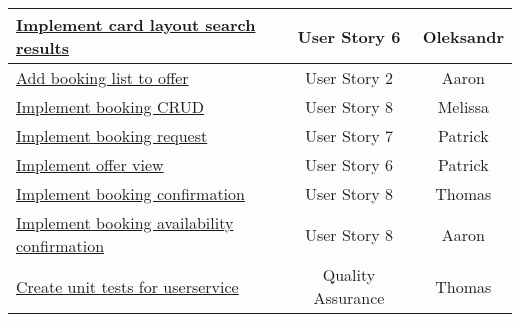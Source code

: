 \begin{table}[h]
\begin{tabular}{|l|c|c|}
        \hline
        \href{https://gitlab.rz.uni-bamberg.de/swt/teaching/2021-ws/swt-swl-b/group-a/-/issues/79}{Implement card layout search results} & User Story 6 & Oleksandr \\
        \hline
        \href{https://gitlab.rz.uni-bamberg.de/swt/teaching/2021-ws/swt-swl-b/group-a/-/issues/74}{Add booking list to offer} & User Story 2 & Aaron \\
        \hline
        \href{https://gitlab.rz.uni-bamberg.de/swt/teaching/2021-ws/swt-swl-b/group-a/-/issues/73}{Implement booking CRUD} & User Story 8 & Melissa \\
        \hline
        \href{https://gitlab.rz.uni-bamberg.de/swt/teaching/2021-ws/swt-swl-b/group-a/-/issues/69}{Implement booking request} & User Story 7 & Patrick \\
        \hline
        \href{https://gitlab.rz.uni-bamberg.de/swt/teaching/2021-ws/swt-swl-b/group-a/-/issues/84}{Implement offer view} & User Story 6 & Patrick \\
        \hline
        \href{https://gitlab.rz.uni-bamberg.de/swt/teaching/2021-ws/swt-swl-b/group-a/-/issues/71}{Implement booking confirmation} & User Story 8 & Thomas \\
        \hline
        \href{https://gitlab.rz.uni-bamberg.de/swt/teaching/2021-ws/swt-swl-b/group-a/-/issues/70}{Implement booking availability confirmation} & User Story 8 & Aaron \\
        \hline
        \href{https://gitlab.rz.uni-bamberg.de/swt/teaching/2021-ws/swt-swl-b/group-a/-/issues/72}{Create unit tests for userservice} & Quality Assurance & Thomas \\
        \hline
    \end{tabular}
\end{table}
